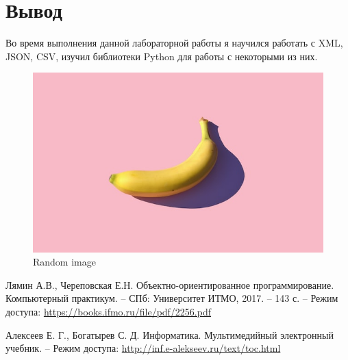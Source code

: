 \section{Вывод}
Во время выполнения данной лабораторной работы я научился работать с XML, JSON, CSV,
изучил библиотеки Python для работы с некоторыми из них.

\clearpage

\begin{centring}
\begin{figure}
    \centering
    \includegraphics[scale=0.3]{img/banana.jpg}
    \caption{Random image}
\end{figure}
\end{centring}
\clearpage

\begin{thebibliography}{9}
\bibitem{} Лямин А.В., Череповская Е.Н. Объектно-ориентированное
программирование. Компьютерный практикум. – СПб: Университет
ИТМО, 2017. – 143 с. – Режим доступа:
\url{https://books.ifmo.ru/file/pdf/2256.pdf}

\bibitem{} Алексеев Е. Г., Богатырев С. Д. Информатика. Мультимедийный электронный учебник. – Режим доступа: \url{http://inf.e-alekseev.ru/text/toc.html}

\end{thebibliography}

